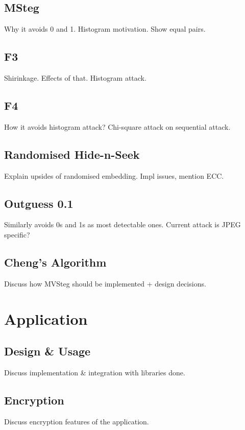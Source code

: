 \documentclass[12pt,british,twoside,notitlepage,usenames,dvipsnames,hypens,final]{report}
\numberwithin{equation}{section}
\numberwithin{figure}{section}
\begin{document}
\subsection{MSteg}

Why it avoids 0 and 1. Histogram motivation. Show equal pairs.

\subsection{F3}

Shirinkage. Effects of that. Histogram attack.

\subsection{F4}

How it avoids histogram attack? Chi-square attack on sequential attack.

\subsection{Randomised Hide-n-Seek}

Explain upsides of randomised embedding. Impl issues, mention ECC. 

\subsection{Outguess 0.1}

Similarly avoids 0s and 1s as most detectable ones. Current attack is JPEG specific?

\subsection{Cheng's Algorithm}

Discuss how MVSteg should be implemented + design decisions.

\section{Application}

\subsection{Design \& Usage}

Discuss implementation \& integration with libraries done.

\subsection{Encryption}
Discuss encryption features of the application.
\end{document}
